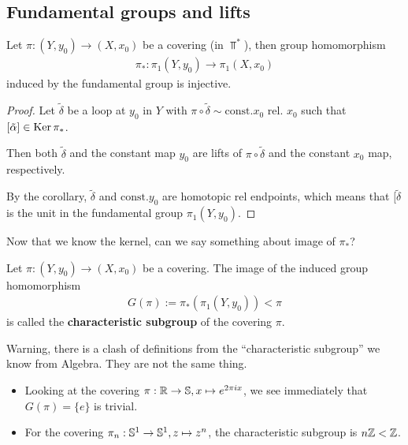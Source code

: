 \subsection{Fundamental groups and lifts}
\begin{cor}[]\label{cor:cor2}
  Let $\pi:(Y,y_0) \to (X,x_0)$ be a covering (in $\Top^{\ast}$), then group homomorphism 
  \begin{align*}
    \pi_{\ast}: \pi_1(Y,y_0) \to \pi_1(X,x_0)
  \end{align*}
  induced by the fundamental group is injective.
\end{cor}
\begin{proof}
  Let $\tilde{\delta}$ be a loop at $y_0$ in $Y$ with $\pi \circ \tilde{\delta} \sim \text{const.} x_0$ rel. $x_0$ such that $[\tilde{\alpha}] \in \operatorname{Ker} \pi_{\ast}$.

  Then both $\tilde{\delta}$ and the constant map $y_0$ are lifts of $\pi \circ \tilde{\delta}$ and the constant $x_0$ map, respectively.

  By the corollary, $\tilde{\delta}$ and $\text{const.} y_0$ are homotopic rel endpoints, which means that $[\tilde{\delta}$ is the unit in the fundamental group $\pi_1(Y,y_0)$.
\end{proof}

Now that we know the kernel, can we say something about image of $\pi_{\ast}$?
\begin{dfn}[]
  Let $\pi:(Y,y_0) \to  (X,x_0)$ be a covering. The image of the induced group homomorphism
  \begin{align*}
    G(\pi) := \pi_{\ast}(\pi_1(Y,y_0)) < \pi
  \end{align*}
  is called the \textbf{characteristic subgroup} of the covering $\pi$.
\end{dfn}
Warning, there is a clash of definitions from the ``characteristic subgroup'' we know from Algebra. They are not the same thing.

\begin{ex}[]
  \begin{itemize}
    \item Looking at the covering $\pi: \mathbb{R} \to \mathbb{S}, x \mapsto  e^{2 \pi i x}$, we see immediately that $G(\pi) = \{e\}$ is trivial.
    \item For the covering $\pi_n: \mathbb{S}^{1} \to \mathbb{S}^{1}, z \mapsto  z^{n}$, the characteristic subgroup is $n\mathbb{Z} < \mathbb{Z}$.
  \end{itemize}
\end{ex}

